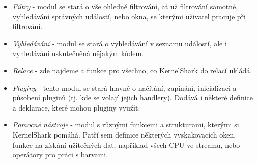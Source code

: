\begin{itemize}
    \item \emph{Filtry} - modul se stará o vše ohledně filtrování, ať už filtrování samotné, vyhledávání správných událostí, nebo okna, se kterými uživatel pracuje při filtrování.
    \item \emph{Vyhledávání} - modul se stará o vyhledávání v seznamu událostí, ale i vyhledávání uskutečněná nějakým kódem.
    \item \emph{Relace} - zde najdeme  a  funkce pro všechno, co KernelShark do relací ukládá.
    \item \emph{Pluginy} - tento modul se stará hlavně o načítání, zapínání, inicializaci a působení pluginů (tj. kde se volají jejich handlery). Dodává i některé definice a deklarace, které mohou pluginy využít.
    \item \emph{Pomocné nástroje} - modul s různými funkcemi a strukturami, kterými si KernelShark pomáhá. Patří sem definice některých vyskakovacích oken, funkce na získání užitečných dat, například všech CPU ve streamu, nebo operátory pro práci s barvami.
\end{itemize}